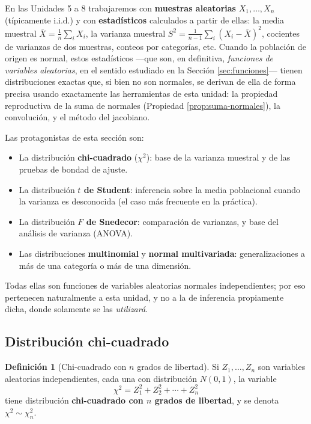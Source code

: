 \documentclass[11pt,a4paper]{article}
\theoremstyle{plain}
\theoremstyle{definition}
\newtheorem{definicion}[teorema]{Definición}
\theoremstyle{remark}
\begin{document}
En las Unidades 5 a 8 trabajaremos con \textbf{muestras aleatorias} $X_1,\dots,X_n$ (típicamente i.i.d.) y con \textbf{estadísticos} calculados a partir de ellas: la media muestral $\bar X = \tfrac1n\sum_i X_i$, la varianza muestral $S^2=\tfrac{1}{n-1}\sum_i(X_i-\bar X)^2$, cocientes de varianzas de dos muestras, conteos por categorías, etc. Cuando la población de origen es normal, estos estadísticos —que son, en definitiva, \emph{funciones de variables aleatorias}, en el sentido estudiado en la Sección \ref{sec:funciones}— tienen distribuciones exactas que, si bien no son normales, se derivan de ella de forma precisa usando exactamente las herramientas de esta unidad: la propiedad reproductiva de la suma de normales (Propiedad \ref{prop:suma-normales}), la convolución, y el método del jacobiano.

Las protagonistas de esta sección son:
\begin{itemize}
\item La distribución \textbf{chi-cuadrado} ($\chi^2$): base de la varianza muestral y de las pruebas de bondad de ajuste.
\item La distribución \textbf{$t$ de Student}: inferencia sobre la media poblacional cuando la varianza es desconocida (el caso más frecuente en la práctica).
\item La distribución \textbf{$F$ de Snedecor}: comparación de varianzas, y base del análisis de varianza (ANOVA).
\item Las distribuciones \textbf{multinomial} y \textbf{normal multivariada}: generalizaciones a más de una categoría o más de una dimensión.
\end{itemize}
Todas ellas son funciones de variables aleatorias normales independientes; por eso pertenecen naturalmente a esta unidad, y no a la de inferencia propiamente dicha, donde solamente se las \emph{utilizará}.

\subsection{Distribución chi-cuadrado}

\begin{definicion}[Chi-cuadrado con $n$ grados de libertad]
Si $Z_1,\dots,Z_n$ son variables aleatorias independientes, cada una con distribución $N(0,1)$, la variable
\[
\chi^2 = Z_1^2+Z_2^2+\cdots+Z_n^2
\]
tiene distribución \textbf{chi-cuadrado con $n$ grados de libertad}, y se denota $\chi^2\sim\chi_n^2$.
\end{definicion}
\end{document}
